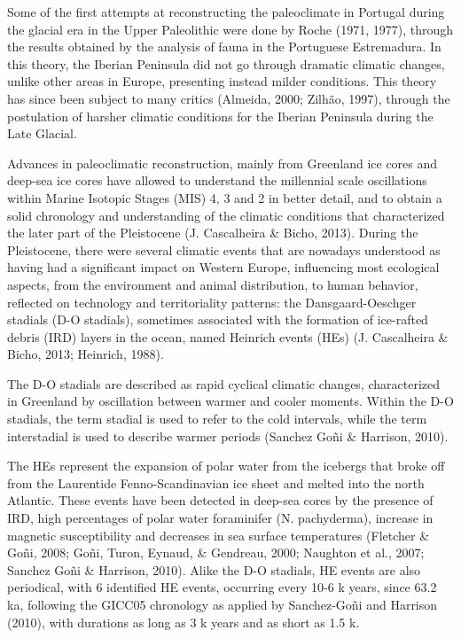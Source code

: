 \documentclass[12pt,twoside]{reedthesis}
\begin{document}
Some of the first attempts at reconstructing the paleoclimate in Portugal during the glacial era in the Upper Paleolithic were done by Roche (1971, 1977), through the results obtained by the analysis of fauna in the Portuguese Estremadura. In this theory, the Iberian Peninsula did not go through dramatic climatic changes, unlike other areas in Europe, presenting instead milder conditions. This theory has since been subject to many critics (Almeida, 2000; Zilhão, 1997), through the postulation of harsher climatic conditions for the Iberian Peninsula during the Late Glacial.

Advances in paleoclimatic reconstruction, mainly from Greenland ice cores and deep-sea ice cores have allowed to understand the millennial scale oscillations within Marine Isotopic Stages (MIS) 4, 3 and 2 in better detail, and to obtain a solid chronology and understanding of the climatic conditions that characterized the later part of the Pleistocene (J. Cascalheira \& Bicho, 2013).
During the Pleistocene, there were several climatic events that are nowadays understood as having had a significant impact on Western Europe, influencing most ecological aspects, from the environment and animal distribution, to human behavior, reflected on technology and territoriality patterns: the Dansgaard-Oeschger stadials (D-O stadials), sometimes associated with the formation of ice-rafted debris (IRD) layers in the ocean, named Heinrich events (HEs) (J. Cascalheira \& Bicho, 2013; Heinrich, 1988).

The D-O stadials are described as rapid cyclical climatic changes, characterized in Greenland by oscillation between warmer and cooler moments. Within the D-O stadials, the term stadial is used to refer to the cold intervals, while the term interstadial is used to describe warmer periods (Sanchez Goñi \& Harrison, 2010).

The HEs represent the expansion of polar water from the icebergs that broke off from the Laurentide Fenno-Scandinavian ice sheet and melted into the north Atlantic. These events have been detected in deep-sea cores by the presence of IRD, high percentages of polar water foraminifer (N. pachyderma), increase in magnetic susceptibility and decreases in sea surface temperatures (Fletcher \& Goñi, 2008; Goñi, Turon, Eynaud, \& Gendreau, 2000; Naughton et al., 2007; Sanchez Goñi \& Harrison, 2010). Alike the D-O stadials, HE events are also periodical, with 6 identified HE events, occurring every 10-6 k years, since 63.2 ka, following the GICC05 chronology as applied by Sanchez-Goñi and Harrison (2010), with durations as long as 3 k years and as short as 1.5 k.
\end{document}
